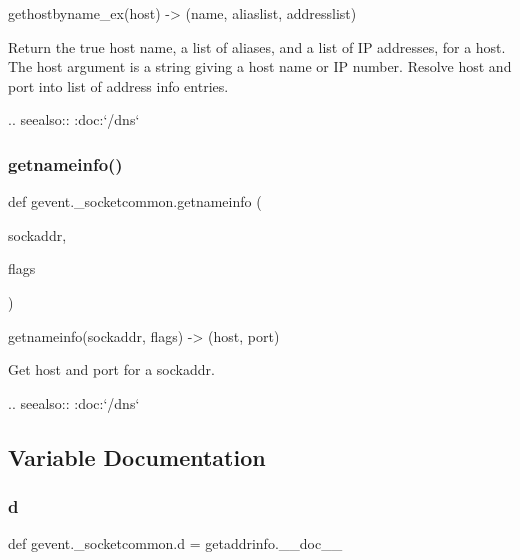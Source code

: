 \begin{DoxyVerb}gethostbyname_ex(host) -> (name, aliaslist, addresslist)

Return the true host name, a list of aliases, and a list of IP addresses,
for a host.  The host argument is a string giving a host name or IP number.
Resolve host and port into list of address info entries.

.. seealso:: :doc:`/dns`
\end{DoxyVerb}
 \mbox{\label{namespacegevent_1_1__socketcommon_a5ad90a103e5f6ff1d4bc8a46321cb519}} 
\subsubsection{\texorpdfstring{getnameinfo()}{getnameinfo()}}
{\footnotesize\ttfamily def gevent.\+\_\+socketcommon.\+getnameinfo (\begin{DoxyParamCaption}\item[{}]{sockaddr,  }\item[{}]{flags }\end{DoxyParamCaption})}

\begin{DoxyVerb}getnameinfo(sockaddr, flags) -> (host, port)

Get host and port for a sockaddr.

.. seealso:: :doc:`/dns`
\end{DoxyVerb}
 

\subsection{Variable Documentation}
\mbox{\label{namespacegevent_1_1__socketcommon_abadc1a71ac7e1c3552c362f380b398cd}} 
\subsubsection{\texorpdfstring{d}{d}}
{\footnotesize\ttfamily def gevent.\+\_\+socketcommon.\+d = getaddrinfo.\+\_\+\+\_\+doc\+\_\+\+\_\+}

